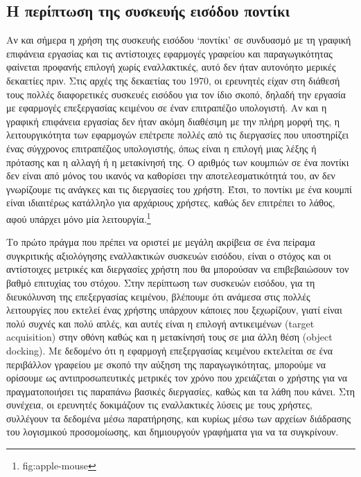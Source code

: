 \documentclass[
]{article}
\begin{document}
\hypertarget{ux3b7-ux3c0ux3b5ux3c1ux3afux3c0ux3c4ux3c9ux3c3ux3b7-ux3c4ux3b7ux3c2-ux3c3ux3c5ux3c3ux3baux3b5ux3c5ux3aeux3c2-ux3b5ux3b9ux3c3ux3ccux3b4ux3bfux3c5-ux3c0ux3bfux3bdux3c4ux3afux3baux3b9}{%
\subsection{Η περίπτωση της συσκευής εισόδου
ποντίκι}\label{ux3b7-ux3c0ux3b5ux3c1ux3afux3c0ux3c4ux3c9ux3c3ux3b7-ux3c4ux3b7ux3c2-ux3c3ux3c5ux3c3ux3baux3b5ux3c5ux3aeux3c2-ux3b5ux3b9ux3c3ux3ccux3b4ux3bfux3c5-ux3c0ux3bfux3bdux3c4ux3afux3baux3b9}}

Αν και σήμερα η χρήση της συσκευής εισόδου `ποντίκι' σε συνδυασμό με τη
γραφική επιφάνεια εργασίας και τις αντίστοιχες εφαρμογές γραφείου και
παραγωγικότητας φαίνεται προφανής επιλογή χωρίς εναλλακτικές, αυτό δεν
ήταν αυτονόητο μερικές δεκαετίες πριν. Στις αρχές της δεκαετίας του
1970, οι ερευνητές είχαν στη διάθεσή τους πολλές διαφορετικές συσκευές
εισόδου για τον ίδιο σκοπό, δηλαδή την εργασία με εφαρμογές επεξεργασίας
κειμένου σε έναν επιτραπέζιο υπολογιστή. Αν και η γραφική επιφάνεια
εργασίας δεν ήταν ακόμη διαθέσιμη με την πλήρη μορφή της, η
λειτουργικότητα των εφαρμογών επέτρεπε πολλές από τις διεργασίες που
υποστηρίζει ένας σύγχρονος επιτραπέζιος υπολογιστής, όπως είναι η
επιλογή μιας λέξης ή πρότασης και η αλλαγή ή η μετακίνησή της. Ο αριθμός
των κουμπιών σε ένα ποντίκι δεν είναι από μόνος του ικανός να καθορίσει
την αποτελεσματικότητά του, αν δεν γνωρίζουμε τις ανάγκες και τις
διεργασίες του χρήστη. Έτσι, το ποντίκι με ένα κουμπί είναι ιδιαιτέρως
κατάλληλο για αρχάριους χρήστες, καθώς δεν επιτρέπει το λάθος, αφού
υπάρχει μόνο μία λειτουργία.\footnote{fig:apple-mouse}

Το πρώτο πράγμα που πρέπει να οριστεί με μεγάλη ακρίβεια σε ένα πείραμα
συγκριτικής αξιολόγησης εναλλακτικών συσκευών εισόδου, είναι ο στόχος
και οι αντίστοιχες μετρικές και διεργασίες χρήστη που θα μπορούσαν να
επιβεβαιώσουν τον βαθμό επιτυχίας του στόχου. Στην περίπτωση των
συσκευών εισόδου, για τη διευκόλυνση της επεξεργασίας κειμένου, βλέπουμε
ότι ανάμεσα στις πολλές λειτουργίες που εκτελεί ένας χρήστης υπάρχουν
κάποιες που ξεχωρίζουν, γιατί είναι πολύ συχνές και πολύ απλές, και
αυτές είναι η επιλογή αντικειμένων (target acquisition) στην οθόνη καθώς
και η μετακίνησή τους σε μια άλλη θέση (object docking). Με δεδομένο ότι
η εφαρμογή επεξεργασίας κειμένου εκτελείται σε ένα περιβάλλον γραφείου
με σκοπό την αύξηση της παραγωγικότητας, μπορούμε να ορίσουμε ως
αντιπροσωπευτικές μετρικές τον χρόνο που χρειάζεται ο χρήστης για να
πραγματοποιήσει τις παραπάνω βασικές διεργασίες, καθώς και τα λάθη που
κάνει. Στη συνέχεια, οι ερευνητές δοκιμάζουν τις εναλλακτικές λύσεις με
τους χρήστες, συλλέγουν τα δεδομένα μέσω παρατήρησης, και κυρίως μέσω
των αρχείων διάδρασης του λογισμικού προσομοίωσης, και δημιουργούν
γραφήματα για να τα συγκρίνουν.
\end{document}
